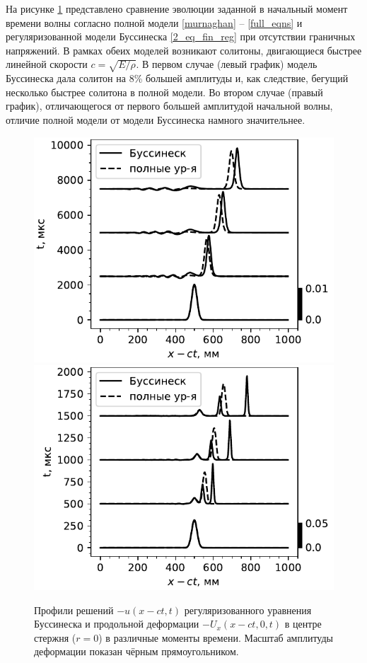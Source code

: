 \documentclass[12pt, a4paper]{article}
\begin{document}
На рисунке \ref{fig:evol_compare} представлено сравнение эволюции заданной в начальный момент времени волны согласно полной модели \eqref{murnaghan} -- \eqref{full_eqns} и регуляризованной модели Буссинеска \eqref{2_eq_fin_reg} при отсутствии граничных напряжений. В рамках обеих моделей возникают солитоны, двигающиеся быстрее линейной скорости $c=\sqrt{E/\rho}$. В первом случае (левый график) модель Буссинеска дала солитон на 8\% большей амплитуды и, как следствие, бегущий несколько быстрее солитона в полной модели. Во втором случае (правый график), отличающегося от первого большей амплитудой начальной волны, отличие полной модели от модели Буссинеска намного значительнее. 
\begin{figure}[h]
	\centering
	\includegraphics[width=0.44\linewidth]{figures/SolEvolCompareSmall}
	\includegraphics[width=0.44\linewidth]{figures/SolEvolCompareSmall2}
	\caption{Профили решений $-u(x-ct, t)$ регуляризованного уравнения Буссинеска и продольной деформации $-U_x(x - ct, 0, t)$ в центре стержня ($r=0$) в различные моменты времени. Масштаб амплитуды деформации показан чёрным прямоугольником.}
	\label{fig:evol_compare}
	\vspace{-2mm}
\end{figure}
\end{document}
